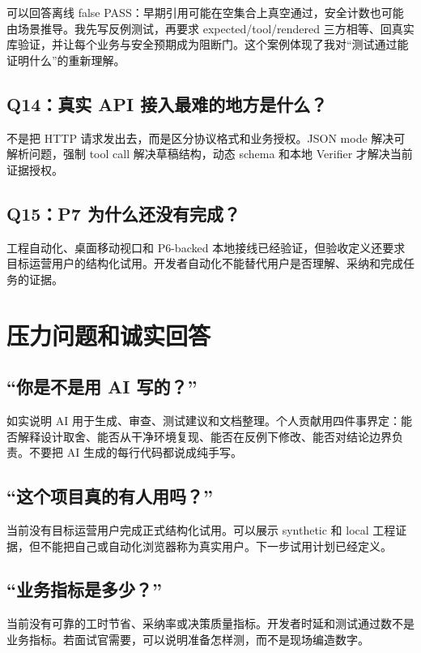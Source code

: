 可以回答离线 false PASS：早期引用可能在空集合上真空通过，安全计数也可能由场景推导。我先写反例测试，再要求 expected/tool/rendered 三方相等、回真实库验证，并让每个业务与安全预期成为阻断门。这个案例体现了我对“测试通过能证明什么”的重新理解。

\subsection{Q14：真实 API 接入最难的地方是什么？}

不是把 HTTP 请求发出去，而是区分协议格式和业务授权。JSON mode 解决可解析问题，强制 tool call 解决草稿结构，动态 schema 和本地 Verifier 才解决当前证据授权。

\subsection{Q15：P7 为什么还没有完成？}

工程自动化、桌面移动视口和 P6-backed 本地接线已经验证，但验收定义还要求目标运营用户的结构化试用。开发者自动化不能替代用户是否理解、采纳和完成任务的证据。

\section{压力问题和诚实回答}

\subsection{“你是不是用 AI 写的？”}

如实说明 AI 用于生成、审查、测试建议和文档整理。个人贡献用四件事界定：能否解释设计取舍、能否从干净环境复现、能否在反例下修改、能否对结论边界负责。不要把 AI 生成的每行代码都说成纯手写。

\subsection{“这个项目真的有人用吗？”}

当前没有目标运营用户完成正式结构化试用。可以展示 synthetic 和 local 工程证据，但不能把自己或自动化浏览器称为真实用户。下一步试用计划已经定义。

\subsection{“业务指标是多少？”}

当前没有可靠的工时节省、采纳率或决策质量指标。开发者时延和测试通过数不是业务指标。若面试官需要，可以说明准备怎样测，而不是现场编造数字。

